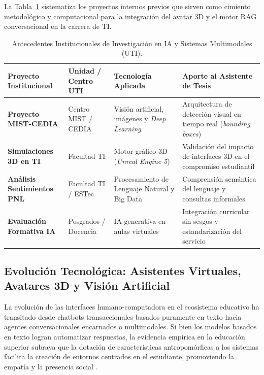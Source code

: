 La Tabla~\ref{tab:proyectos_internos_uti} sistematiza los proyectos internos previos que sirven como cimiento metodológico y computacional para la integración del avatar 3D y el motor RAG conversacional en la carrera de TI.

\begin{table}[h]
  \caption{Antecedentes Institucionales de Investigación en IA y Sistemas Multimodales (UTI).}
  \label{tab:proyectos_internos_uti}
\centering
\small
\setlength{\tabcolsep}{4pt}
\renewcommand{\arraystretch}{1.25}
\begin{tabular}{|>{\raggedright\arraybackslash}p{3.0cm}|>{\raggedright\arraybackslash}p{2.8cm}|>{\raggedright\arraybackslash}p{3.5cm}|>{\raggedright\arraybackslash}p{3.5cm}|}
\hline
\rowcolor[HTML]{EFEFEF}
\textbf{Proyecto Institucional} & \textbf{Unidad / Centro UTI} & \textbf{Tecnología Aplicada} & \textbf{Aporte al Asistente de Tesis} \\ \hline
\textbf{Proyecto MIST-CEDIA} \cite{uti2025cedia} & Centro MIST / CEDIA & Visión artificial, imágenes y \textit{Deep Learning} & Arquitectura de detección visual en tiempo real (\textit{bounding boxes}) \\ \hline
\textbf{Simulaciones 3D en TI} \cite{uti2024unreal} & Facultad TI & Motor gráfico 3D (\textit{Unreal Engine 5}) & Validación del impacto de interfaces 3D en el compromiso estudiantil \\ \hline
\textbf{Análisis Sentimientos PNL} \cite{uti2024pln} & Facultad TI / ESTec & Procesamiento de Lenguaje Natural y Big Data & Comprensión semántica del lenguaje y consultas informales \\ \hline
\textbf{Evaluación Formativa IA} \cite{uti2025rc} & Posgrados / Docencia & IA generativa en aulas virtuales & Integración curricular sin sesgos y estandarización del servicio \\ \hline
\end{tabular}
\elaboradopor{\autorTFG}
\end{table}

\subsection{Evolución Tecnológica: Asistentes Virtuales, Avatares 3D y Visión Artificial}
La evolución de las interfaces humano-computadora en el ecosistema educativo ha transitado desde chatbots transaccionales basados puramente en texto hacia agentes conversacionales encarnados o multimodales. Si bien los modelos basados en texto logran automatizar respuestas, la evidencia empírica en la educación superior subraya que la dotación de características antropomórficas a los sistemas facilita la creación de entornos centrados en el estudiante, promoviendo la empatía y la presencia social \cite{robinson2024ai}.

